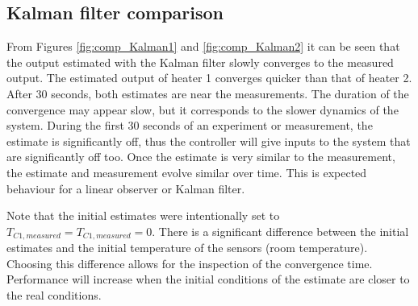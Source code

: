 \subsection{Kalman filter comparison}
From Figures \ref{fig:comp_Kalman1} and \ref{fig:comp_Kalman2} it can be seen that the output estimated with the Kalman filter slowly converges to the measured output. The estimated output of heater 1 converges quicker than that of heater 2. After 30 seconds, both estimates are near the measurements. The duration of the convergence may appear slow, but it corresponds to the slower dynamics of the system. During the first 30 seconds of an experiment or measurement, the estimate is significantly off, thus the controller will give inputs to the system that are significantly off too. Once the estimate is very similar to the measurement, the estimate and measurement evolve similar over time. This is expected behaviour for a linear observer or Kalman filter.

Note that the initial estimates were intentionally set to $T_{C1,measured} = T_{C1,measured} = 0$. There is a significant difference between the initial estimates and the initial temperature of the sensors (room temperature). Choosing this difference allows for the inspection of the convergence time. Performance will increase when the initial conditions of the estimate are closer to the real conditions.

